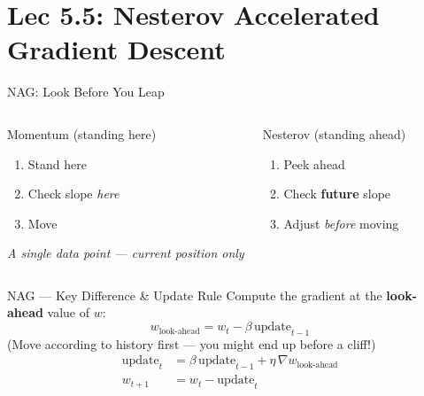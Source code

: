 \documentclass{beamer}
\begin{document}
\section{Lec 5.5: Nesterov Accelerated Gradient Descent}

\begin{frame}[shrink=10]{NAG: Look Before You Leap}
  \begin{columns}[T]
    \begin{block}{Momentum (standing here)}
      \begin{enumerate}\setlength\itemsep{4pt}
        \item Stand here
        \item Check slope \emph{here}
        \item Move
      \end{enumerate}
      \smallskip
      \textit{A single data point --- current position only}
    \end{block}

    \begin{block}{Nesterov (standing ahead)}
      \begin{enumerate}\setlength\itemsep{4pt}
        \item Peek ahead
        \item Check \textbf{future} slope
        \item Adjust \emph{before} moving
      \end{enumerate}
    \end{block}
  \end{columns}

  \medskip

  \begin{block}{NAG --- Key Difference \& Update Rule}
    Compute the gradient at the \textbf{look-ahead} value of $w$:
    \[
      w_{\text{look-ahead}} = w_t - \beta\,\text{update}_{t-1}
    \]
    (Move according to history first --- you might end up before a cliff!)
    \begin{align*}
      \text{update}_t &= \beta\,\text{update}_{t-1}
                        + \eta\,\nabla w_{\text{look-ahead}}\\
      w_{t+1}        &= w_t - \text{update}_t
    \end{align*}
  \end{block}
\end{frame}
\end{document}
